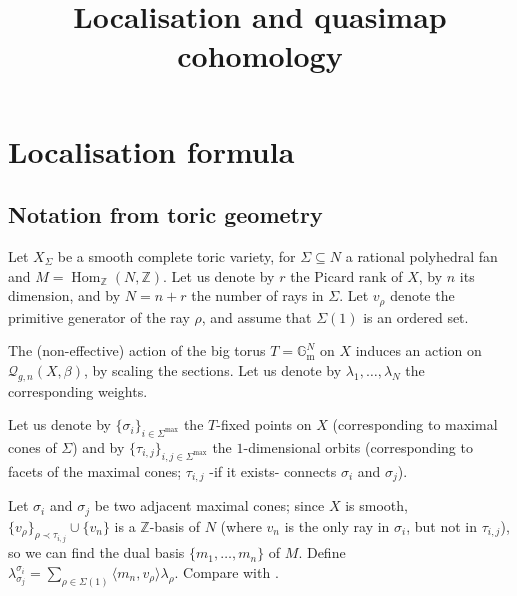 \documentclass[11pt]{amsart}
\title[]{Localisation and quasimap cohomology}
\author{}
\newcommand{\Q}[4]{\mathcal{Q}_{#1,#2}(#3,#4)}
\newcommand{\Hom}{\operatorname{Hom}}
\newcommand{\Gm}{\mathbb{G}_{\text{m}}}
\newcommand{\ZZ}{\mathbb{Z}}
\theoremstyle{definition}
\theoremstyle{definition}
\begin{document}
\maketitle
\appendixtitletocoff
\tableofcontents

\section{Localisation formula}
\subsection{Notation from toric geometry}
Let $X_\Sigma$ be a smooth complete toric variety, for $\Sigma\subseteq N$ a rational polyhedral fan and $M=\Hom_{\ZZ}(N,\ZZ)$. Let us denote by $r$ the Picard rank of $X$, by $n$ its dimension, and by $N=n+r$ the number of rays in $\Sigma$. Let $v_\rho$ denote the primitive generator of the ray $\rho$, and assume that $\Sigma(1)$ is an ordered set.

The (non-effective) action of the big torus $T=\Gm^N$ on $X$ induces an action on $\Q{g}{n}{X}{\beta}$, by scaling the sections. Let us denote by $\lambda_1,\ldots,\lambda_N$ the corresponding weights.

Let us denote by $\{\sigma_i\}_{i\in\Sigma^\text{max}}$ the $T$-fixed points on $X$ (corresponding to maximal cones of $\Sigma$) and by $\{\tau_{i,j}\}_{i,j\in\Sigma^\text{max}}$ the $1$-dimensional orbits (corresponding to facets of the maximal cones; $\tau_{i,j}$ -if it exists- connects $\sigma_i$ and $\sigma_j$).

Let $\sigma_i$ and $\sigma_j$ be two adjacent maximal cones; since $X$ is smooth, $\{v_\rho\}_{\rho\prec\tau_{i,j}}\cup\{v_n\}$ is a $\ZZ$-basis of $N$ (where $v_n$ is the only ray in $\sigma_i$, but not in $\tau_{i,j}$), so we can find the dual basis $\{m_1,\ldots,m_n\}$ of $M$. Define $\lambda^{\sigma_i}_{\sigma_j}=\sum_{\rho\in\Sigma(1)}\langle m_n,v_\rho\rangle\lambda_\rho$. Compare with \cite[\S\S 6.4 and 7.3]{HolgerSpielberg}.
\end{document}
